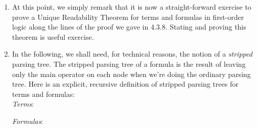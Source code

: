 \begin{enumerate}[\thesection.1]
	\item At this point, we simply remark that it is now a straight-forward exercise to prove a Unique Readability Theorem for terms and formulas in first-order logic along the lines of the proof we gave in 4.3.8. Stating and proving this theorem is useful exercise.
			
	\item In the following, we shall need, for technical reasons, the notion of a \emph{stripped} parsing tree. The stripped parsing tree of a formula is the result of leaving only the main operator on each node when we're doing the ordinary parsing tree. Here is an explicit, recursive definition of stripped parsing trees for terms and formulas:\\[2ex]
	
\emph{Terms}:\\[2ex]
\begin{center}
\end{center}	
	
\emph{Formulas}:\\[1ex]
\begin{center}
\end{center}
\end{enumerate}
